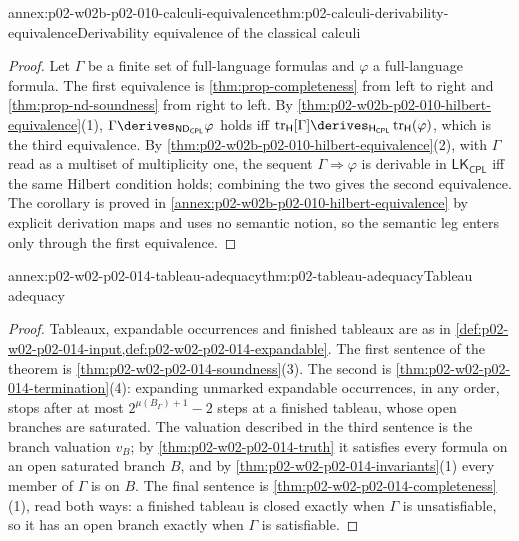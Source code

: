 \begin{annexitem}{annex:p02-w02b-p02-010-calculi-equivalence}{thm:p02-calculi-derivability-equivalence}{Derivability equivalence of the classical calculi}
\begin{proof}
Let \(\Gamma\) be a finite set of full-language formulas and \(\varphi\) a
full-language formula.  The first equivalence is
\cref{thm:prop-completeness} from left to right and
\cref{thm:prop-nd-soundness} from right to left.  By
\cref{thm:p02-w02b-p02-010-hilbert-equivalence}(1),
\(\Gamma\derives_{\mathsf{ND}_{\mathsf{CPL}}}\varphi\) holds iff
\(\operatorname{tr}_{\mathsf H}[\Gamma]\derives_{\mathsf H_{\mathsf{CPL}}}
\operatorname{tr}_{\mathsf H}(\varphi)\), which is the third equivalence.
By \cref{thm:p02-w02b-p02-010-hilbert-equivalence}(2), with \(\Gamma\) read
as a multiset of multiplicity one, the sequent \(\Gamma\Rightarrow\varphi\)
is derivable in \(\mathsf{LK}_{\mathsf{CPL}}\) iff the same Hilbert
condition holds; combining the two gives the second equivalence.  The
corollary is proved in \cref{annex:p02-w02b-p02-010-hilbert-equivalence}
by explicit derivation maps and uses no semantic notion, so the semantic
leg enters only through the first equivalence.
\end{proof}
\end{annexitem}

\begin{annexitem}{annex:p02-w02-p02-014-tableau-adequacy}{thm:p02-tableau-adequacy}{Tableau adequacy}
\begin{proof}
Tableaux, expandable occurrences and finished tableaux are as in
\cref{def:p02-w02-p02-014-input,def:p02-w02-p02-014-expandable}.  The first
sentence of the theorem is \cref{thm:p02-w02-p02-014-soundness}(3).  The
second is \cref{thm:p02-w02-p02-014-termination}(4): expanding unmarked
expandable occurrences, in any order, stops after at most
\(2^{\mu(B_\Gamma)+1}-2\) steps at a finished tableau, whose open branches are
saturated.  The valuation described in the third sentence is the branch
valuation \(v_B\); by \cref{thm:p02-w02-p02-014-truth} it satisfies every
formula on an open saturated branch \(B\), and by
\cref{thm:p02-w02-p02-014-invariants}(1) every member of \(\Gamma\) is on
\(B\).  The final sentence is \cref{thm:p02-w02-p02-014-completeness}(1),
read both ways: a finished tableau is closed exactly when \(\Gamma\) is
unsatisfiable, so it has an open branch exactly when \(\Gamma\) is
satisfiable.
\end{proof}
\end{annexitem}
